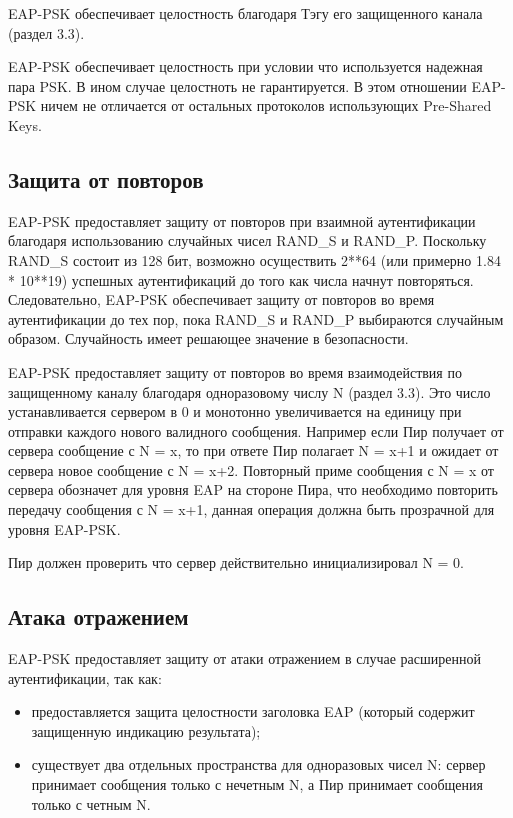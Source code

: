 EAP-PSK обеспечивает целостность благодаря Тэгу его защищенного канала (раздел 3.3).

EAP-PSK обеспечивает целостность при условии что используется надежная пара PSK. В ином случае целостноть не гарантируется.  В этом отношении EAP-PSK ничем не отличается от остальных протоколов использующих Pre-Shared Keys.

\subsection{Защита от повторов}

EAP-PSK предоставляет защиту от повторов при взаимной аутентификации благодаря использованию случайных чисел RAND\_S и RAND\_P. Поскольку RAND\_S состоит из 128 бит, возможно осуществить 2**64 (или примерно 1.84 * 10**19) успешных аутентификаций до того как числа начнут повторяться. Следовательно, EAP-PSK обеспечивает защиту от повторов во время аутентификации до тех пор, пока RAND\_S и RAND\_P выбираются случайным образом. Случайность имеет решающее значение в безопасности.

EAP-PSK предоставляет защиту от повторов  во время взаимодействия по защищенному каналу благодаря одноразовому числу N (раздел 3.3). Это число устанавливается сервером в 0 и монотонно увеличивается на единицу при отправки каждого нового валидного сообщения. Например если Пир получает от сервера сообщение с N = x, то при ответе Пир полагает N = x+1 и ожидает от сервера новое сообщение с N = x+2. Повторный приме сообщения с N = x от сервера обозначет для уровня EAP на стороне Пира, что необходимо повторить передачу сообщения с N = x+1, данная операция должна быть прозрачной для уровня EAP-PSK.

Пир должен проверить что сервер действительно инициализировал N = 0.

\subsection{Атака отражением}

EAP-PSK предоставляет защиту от атаки отражением в случае расширенной аутентификации, так как:

\begin{itemize}
\item предоставляется защита целостности заголовка EAP (который содержит защищенную индикацию результата);
\item существует два отдельных пространства для одноразовых чисел N: сервер принимает сообщения только с нечетным N, а Пир принимает сообщения только с четным N.
\end{itemize}

